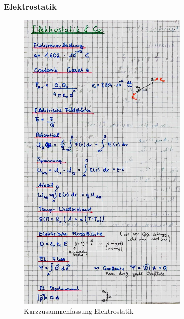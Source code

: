 \documentclass[12pt,a4paper]{article}%
\numberwithin{equation}{section}
\numberwithin{equation}{subsection}
\begin{document}
\subsubsection{Elektrostatik}
\begin{figure}[H] 
	  \centering
	  \includegraphics[width=0.75\textwidth]{1_Elektrostatik.jpg}
	  \caption{Kurzzusammenfassung Elektrostatik}
	  \label{fig:elektrostatik}
  \end{figure}
  \newpage
\end{document}
